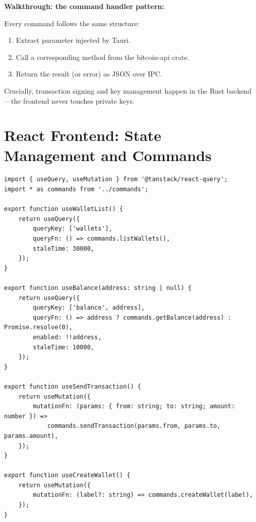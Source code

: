 \textbf{Walkthrough: the command handler pattern:}

Every command follows the same structure:

\begin{enumerate}
  \item Extract  parameter injected by Tauri.
  \item Call a corresponding  method from the bitcoin-api crate.
  \item Return the result (or error) as JSON over IPC.
\end{enumerate}

Crucially, transaction signing and key management happen in the Rust backend---the frontend never touches private keys.

\section{React Frontend: State Management and Commands}
\label{sec:ch19-frontend}

\begin{listing}[H]
\caption{React Query hooks ()}
\label{lst:ch19-hooks}
\begin{verbatim}
import { useQuery, useMutation } from '@tanstack/react-query';
import * as commands from '../commands';

export function useWalletList() {
    return useQuery({
        queryKey: ['wallets'],
        queryFn: () => commands.listWallets(),
        staleTime: 30000,
    });
}

export function useBalance(address: string | null) {
    return useQuery({
        queryKey: ['balance', address],
        queryFn: () => address ? commands.getBalance(address) : Promise.resolve(0),
        enabled: !!address,
        staleTime: 10000,
    });
}

export function useSendTransaction() {
    return useMutation({
        mutationFn: (params: { from: string; to: string; amount: number }) =>
            commands.sendTransaction(params.from, params.to, params.amount),
    });
}

export function useCreateWallet() {
    return useMutation({
        mutationFn: (label?: string) => commands.createWallet(label),
    });
}
\end{verbatim}
\end{listing}

